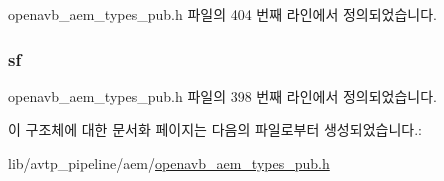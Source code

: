 openavb\+\_\+aem\+\_\+types\+\_\+pub.\+h 파일의 404 번째 라인에서 정의되었습니다.

\subsubsection[{\texorpdfstring{sf}{sf}}]{ sf}\hypertarget{structopenavb__aem__stream__format__iec__61883__6__am824__t_a153db177c2b7653917dff143e5f755e1}{}\label{structopenavb__aem__stream__format__iec__61883__6__am824__t_a153db177c2b7653917dff143e5f755e1}


openavb\+\_\+aem\+\_\+types\+\_\+pub.\+h 파일의 398 번째 라인에서 정의되었습니다.



이 구조체에 대한 문서화 페이지는 다음의 파일로부터 생성되었습니다.\+:\begin{DoxyCompactItemize}
\item 
lib/avtp\+\_\+pipeline/aem/\hyperlink{openavb__aem__types__pub_8h}{openavb\+\_\+aem\+\_\+types\+\_\+pub.\+h}\end{DoxyCompactItemize}
